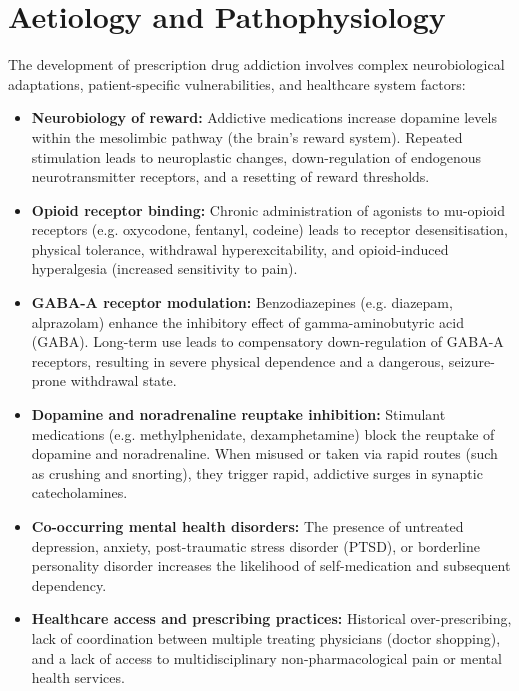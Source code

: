 \section*{Aetiology and Pathophysiology}
The development of prescription drug addiction involves complex neurobiological adaptations, patient-specific vulnerabilities, and healthcare system factors:
\begin{itemize}
    \item \textbf{Neurobiology of reward:} Addictive medications increase dopamine levels within the mesolimbic pathway (the brain's reward system). Repeated stimulation leads to neuroplastic changes, down-regulation of endogenous neurotransmitter receptors, and a resetting of reward thresholds.
    \item \textbf{Opioid receptor binding:} Chronic administration of agonists to mu-opioid receptors (e.g. oxycodone, fentanyl, codeine) leads to receptor desensitisation, physical tolerance, withdrawal hyperexcitability, and opioid-induced hyperalgesia (increased sensitivity to pain).
    \item \textbf{GABA-A receptor modulation:} Benzodiazepines (e.g. diazepam, alprazolam) enhance the inhibitory effect of gamma-aminobutyric acid (GABA). Long-term use leads to compensatory down-regulation of GABA-A receptors, resulting in severe physical dependence and a dangerous, seizure-prone withdrawal state.
    \item \textbf{Dopamine and noradrenaline reuptake inhibition:} Stimulant medications (e.g. methylphenidate, dexamphetamine) block the reuptake of dopamine and noradrenaline. When misused or taken via rapid routes (such as crushing and snorting), they trigger rapid, addictive surges in synaptic catecholamines.
    \item \textbf{Co-occurring mental health disorders:} The presence of untreated depression, anxiety, post-traumatic stress disorder (PTSD), or borderline personality disorder increases the likelihood of self-medication and subsequent dependency.
    \item \textbf{Healthcare access and prescribing practices:} Historical over-prescribing, lack of coordination between multiple treating physicians (doctor shopping), and a lack of access to multidisciplinary non-pharmacological pain or mental health services.
\end{itemize}

